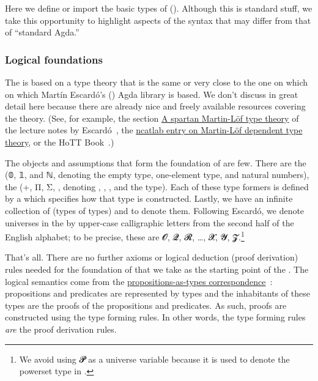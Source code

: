 Here we define or import the basic types of  (\mltt).  Although this is standard stuff, we take this opportunity to highlight aspects of the \ualib syntax that may differ from that of ``standard Agda.''

\subsubsection{Logical foundations}\label{sec:logical-foundations}
The \agdaualib is based on a type theory that is the same or very close to the one on which on which Martín Escardó's \typetopology (\typtop) Agda library is based. We don't discuss \mltt in great detail here because there are already nice and freely available resources covering the theory. (See, for example, the section \href{https://www.cs.bham.ac.uk/~mhe/HoTT-UF-in-Agda-Lecture-Notes/HoTT-UF-Agda.html\#mlttinagda}{A spartan Martin-Löf type theory} of the lecture notes by Escard\'o~\cite{MHE}, the \href{https://ncatlab.org/nlab/show/Martin-L\%C3\%B6f+dependent+type+theory}{ncatlab entry on Martin-Löf dependent type theory}, or the HoTT Book~\cite{HoTT}.)

The objects and assumptions that form the foundation of \mltt are few.  There are the  (\ad 𝟘, \ad 𝟙, and \ad ℕ, denoting the empty type, one-element type, and natural numbers), the  (\ad +, \ad Π, \ad Σ, , denoting , , , and the  type). Each of these type formers is defined by a  which specifies how that type is constructed. Lastly, we have an infinite collection of  (types of types) and  to denote them. Following Escardó, we denote universes in the \ualib by upper-case calligraphic letters from the second half of the English alphabet; to be precise, these are \ab 𝓞, \ab 𝓠, \ab 𝓡, …, \ab 𝓧, \ab 𝓨, \ab 𝓩.\footnote{We avoid using \ab 𝓟 as a universe variable because it is used to denote the powerset type in \typtop.}

That's all. There are no further axioms or logical deduction (proof derivation) rules needed for the foundation of \mltt that we take as the starting point of the \agdaualib. The logical semantics come from the \href{https://ncatlab.org/nlab/show/propositions+as+types}{propositions-as-types correspondence}~\cite{nlab:propositions_as_types}: propositions and predicates are represented by types and the inhabitants of these types are the proofs of the propositions and predicates. As such, proofs are constructed using the type forming rules. In other words, the type forming rules \emph{are} the proof derivation rules.

